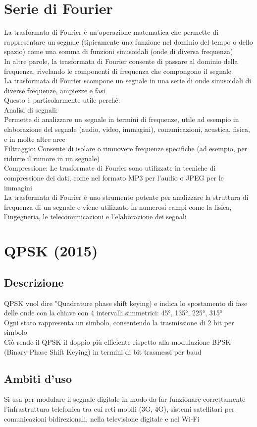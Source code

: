 \documentclass[10pt,oneside,a4paper]{article}
\begin{document}
\section{Serie di Fourier}
La trasformata di Fourier è un'operazione matematica che permette di rappresentare un segnale (tipicamente una funzione nel dominio del tempo o dello spazio) come una somma di funzioni sinusoidali (onde di diversa frequenza)\\
In altre parole, la trasformata di Fourier consente di passare al dominio della frequenza, rivelando le componenti di frequenza che compongono il segnale\\
La trasformata di Fourier scompone un segnale in una serie di onde sinusoidali di diverse frequenze, ampiezze e fasi\\
Questo è particolarmente utile perché:\\
Analisi di segnali:\\
Permette di analizzare un segnale in termini di frequenze, utile ad esempio in elaborazione del segnale (audio, video, immagini), comunicazioni, acustica, fisica, e in molte altre aree\\
Filtraggio: Consente di isolare o rimuovere frequenze specifiche (ad esempio, per ridurre il rumore in un segnale)\\
Compressione: Le trasformate di Fourier sono utilizzate in tecniche di compressione dei dati, come nel formato MP3 per l'audio o JPEG per le immagini\\
La trasformata di Fourier è uno strumento potente per analizzare la struttura di frequenza di un segnale e viene utilizzato in numerosi campi come la fisica, l'ingegneria, le telecomunicazioni e l'elaborazione dei segnali
\section{QPSK (2015)}
\subsection{Descrizione}
QPSK vuol dire "Quadrature phase shift keying) e indica lo spostamento di fase delle onde con la chiave con 4 intervalli simmetrici: 45°, 135°, 225°, 315°\\
Ogni stato rappresenta un simbolo, consentendo la trasmissione di 2 bit per simbolo\\
Ciò rende il QPSK il doppio più efficiente rispetto alla modulazione BPSK (Binary Phase Shift Keying) in termini di bit trasmessi per baud
\subsection{Ambiti d'uso}
Si usa per modulare il segnale digitale in modo da far funzionare correttamente l'infrastruttura telefonica tra cui reti mobili (3G, 4G), sistemi satellitari per comunicazioni bidirezionali, nella televisione digitale e nel Wi-Fi
\end{document}
